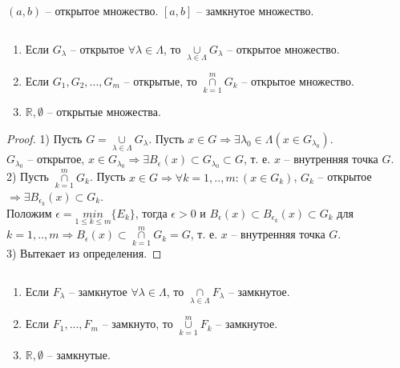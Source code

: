     \begin{example}
        $(a,b)$ -- открытое множество.
        $[a,b]$ -- замкнутое множество.
    \end{example}
    
    \begin{lemma}
        $\text{}$
        \begin{enumerate}
            \item Если $G_{\lambda}$ -- открытое $\forall \lambda \in \Lambda$, то $\underset{\lambda \in \Lambda}{\cup} G_{\lambda}$ -- открытое множество.
            \item Если $G_{1}, G_{2}, ..., G_{m}$ -- открытые, то $\overset{m}{\underset{k = 1}{\cap}} G_{k}$ -- открытое множество.
            \item $\mathds{R}, \emptyset$ -- открытые множества.
        \end{enumerate}
    \end{lemma}
    
    \begin{proof}
        1) Пусть $G = \underset{\lambda \in \Lambda}{\cup} G_{\lambda}$. Пусть $x \in G \Rightarrow \exists \lambda_{0} \in \Lambda (x \in G_{\lambda_0})$.
        \\
        $G_{\lambda_0}$ -- открытое, $x \in G_{\lambda_0} \Rightarrow \exists B_{\epsilon}(x) \subset G_{\lambda_0} \subset G$, т. е. $x$ -- внутренняя точка $G$.
        \\
        2) Пусть $\overset{m}{\underset{k = 1}{\cap}} G_{k}$. Пусть $x \in G \Rightarrow \forall k = 1, .., m: (x \in G_{k})$, $G_k$ -- открытое $\Rightarrow \exists B_{\epsilon_{k}} (x) \subset G_{k}$.
        \\
        Положим $\epsilon = \underset{1 \leq k \leq m}{min}\{E_{k}\}$, тогда $\epsilon > 0$ и $B_{\epsilon}(x) \subset B_{\epsilon_{k}}(x) \subset G_{k}$ для $k = 1, .., m \Rightarrow B_{\epsilon}(x) \subset \overset{m}{\underset{k = 1}{\cap}} G_{k} = G$, т. е. $x$ -- внутренняя точка $G$.
        \\
        3) Вытекает из определения.
    \end{proof}
    
    \begin{lemma}
        $\text{}$
        \begin{enumerate}
            \item Если $F_{\lambda}$ -- замкнутое $\forall \lambda \in \Lambda$, то $\underset{\lambda \in \Lambda}{\cap} F_{\lambda}$ -- замкнутое.
            \item Если $F_{1}, ..., F_{m}$ -- замкнуто, то $\overset{m}{\underset{k = 1}{\cup}} F_{k}$ -- замкнутое.
            \item $\mathds{R}, \emptyset$ -- замкнутые.
        \end{enumerate}
    \end{lemma}
    
